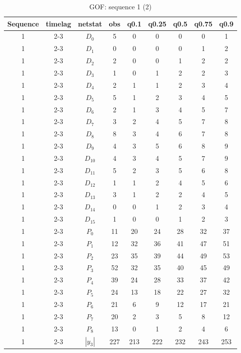 \documentclass[aspectratio=169,ignorenonframetext,9pt]{beamer}
\theoremstyle{plain}
\theoremstyle{definition}
\begin{document}
\clearpage
\begin{table}[h!]
    \centering
        \begin{tabular}{c| c | c | c | c |c |c |c |c }
            Sequence& timelag & netstat & obs & q0.1 & q0.25 & q0.5 & q0.75 & q0.9 \\
            \hline \hline
            1 & 2-3 & $D_0$ & 5 &  0& 0& 0& 0& 1 \\
            1 & 2-3 & $D_1$ & 0 &  0& 0& 0& 1& 2 \\
            1 & 2-3 & $D_2$ & 2 &  0& 0& 1& 2& 2 \\
            1 & 2-3 & $D_3$ & 1 &  0& 1& 2& 2& 3 \\
            1 & 2-3 & $D_4$ & 2 &  1& 1& 2& 3& 4 \\
            1 & 2-3 & $D_5$ & 5 &  1& 2& 3& 4& 5 \\
            1 & 2-3 & $D_6$ & 2 &  1& 3& 4& 5& 7 \\
            1 & 2-3 & $D_7$ & 3 &  2& 4& 5& 7& 8 \\
            1 & 2-3 & $D_8$ & 8 &  3& 4& 6& 7& 8 \\
            1 & 2-3 & $D_9$ & 4 &  3& 5& 6& 8& 9 \\
            1 & 2-3 & $D_{10}$ & 4 &  3& 4& 5& 7& 9 \\
            1 & 2-3 & $D_{11}$ & 5 &  2& 3& 5& 6& 8 \\
            1 & 2-3 & $D_{12}$ & 1 &  1& 2& 4& 5& 6 \\
            1 & 2-3 & $D_{13}$ & 3 &  1& 2& 2& 4& 5 \\
            1 & 2-3 & $D_{14}$ & 0 &  0& 1& 2& 3& 4 \\
            1 & 2-3 & $D_{15}$ & 1 &  0& 0& 1& 2& 3 \\
            1 & 2-3 & $P_0$ & 11 & 20& 24& 28& 32& 37 \\
            1 & 2-3 & $P_1$ & 12 & 32& 36& 41& 47& 51 \\
            1 & 2-3 & $P_2$ & 23 & 35& 39& 44& 49& 53 \\
            1 & 2-3 & $P_3$ & 52 & 32& 35& 40& 45& 49 \\
            1 & 2-3 & $P_4$ & 39 & 24& 28& 33& 37& 42 \\
            1 & 2-3 & $P_5$ & 24 & 13& 18& 22& 27& 32 \\
            1 & 2-3 & $P_6$ & 21 &  6& 9& 12& 17& 21 \\
            1 & 2-3 & $P_7$ & 20 &  2& 3& 5& 8& 12 \\
            1 & 2-3 & $P_8$ & 13 &  0& 1& 2& 4& 6 \\
            1 & 2-3 & $|y_3|$ & 227 &  213& 222& 232& 243& 253 \\
        \end{tabular}
        \caption{GOF: sequence 1 (2)}
    \end{table}
\clearpage
\end{document}
